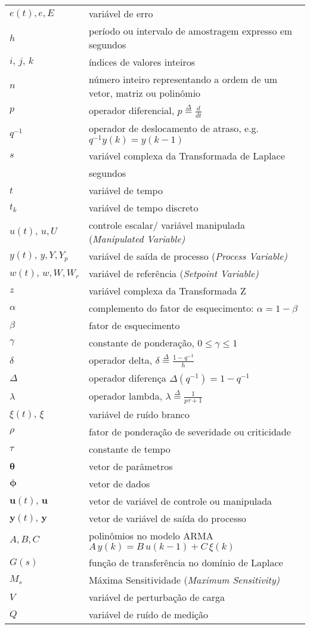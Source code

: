 \begin{tabular}{ll}
$e(t), e, E$				& variável de erro\\
$h$ 						& período ou intervalo de amostragem expresso em segundos \\ 
$i,\,j,\,k$ 					& índices de valores inteiros  \\ 
$n$						& número inteiro representando a ordem de um vetor, matriz ou polinômio \\
$p$						& operador diferencial,  $p\overset{\Delta}{=}\frac{d}{dt}$	\\
$q^{-1}$ 					& operador de deslocamento de atraso, e.g.  $q^{-1}y(k)=y(k-1)$ 							\\ 
$s$						& variável complexa da Transformada de Laplace 				\\
						& segundos\\
$t$						& variável de tempo\\
$t_k$					& variável de tempo discreto\\
$u(t),\,u, U$ 				& controle escalar/ variável manipulada (\it{Manipulated Variable})\\ 
$y(t),\,y, Y, Y_p$ 			& variável de saída de processo (\it{Process Variable})\\ 
$w(t),\,w, W, W_r$ 			& variável de referência (\it{Setpoint Variable}) \\ 
$z$						& variável complexa  da Transformada  Z						\\
$\alpha$					& complemento do fator de esquecimento: $\alpha = 1 - \beta $\\
$\beta$					& fator de esquecimento\\
$\gamma$				& constante de ponderação, $0\le \gamma \le 1$\\
$\delta$					& operador delta, $\delta \overset{\Delta}{=}\frac{1-q^{-1}}{h}$\\
$\Delta$					& operador diferença  $\Delta(q^{-1}) = 1-q^{-1}$ 				\\ 
$\lambda$					& operador lambda, $\lambda \overset{\Delta}{=}\frac{1}{p\tau+1}$\\
$\xi (t),\,\xi $ 				& variável de ruído branco\\ 
$\rho$					& fator  de ponderação de severidade ou criticidade\\
$\tau$					& constante de tempo\\
$\mathbf{\theta}$					& vetor de parâmetros\\
$\mathbf{\phi}$					& vetor de dados\\
$\mathbf{u}(t),\,\mathbf{u}$ 	& vetor de variável de controle ou manipulada\\ 
$\mathbf{y}(t),\mathbf{\,y}$ 	& vetor de variável de saída do processo\\ 
$A, B, C$ 					& polinômios no modelo ARMA $A\,y(k)=B\,u(k-1)+C\,\xi (k)$ \\
$G(s)$ 					& função de transferência no domínio de Laplace \\ 
$M_s$					& Máxima Sensitividade (\it{Maximum Sensitivity})\\
$V$ 						& variável de perturbação de carga \\ 
$Q$ 						& variável de ruído de medição
\end{tabular}

